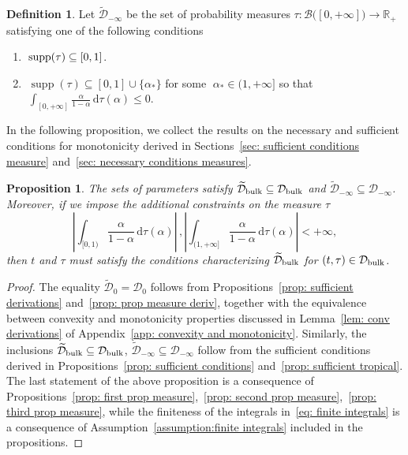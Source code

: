 \documentclass[aps,pra,11pt,onecolumn,nofootinbib,tightenlines]{revtex4-2}
\newtheorem{proposition}[theorem]{Proposition}
\theoremstyle{definition}
\newtheorem{definition}[theorem]{Definition}
\newcommand{\D}{\mathcal{D}}
\newcommand{\mc}[1]{\mathcal{#1}}
\newcommand{\mb}[1]{\mathbb{#1}}
\begin{document}
\begin{definition}
\label{def: D_infty}
 Let \(\widetilde{\D}_{-\infty}\) be the set of probability measures $\tau:\mc B\big([0,+\infty]\big)\to\mb R_+$ satisfying one of the following conditions
    \begin{enumerate}[itemsep=0pt,topsep=5pt]
    \item  $\;\textup{supp}(\tau) \subseteq [0,1]$.
    \item $\;\operatorname{supp}(\tau) \subseteq [0,1] \cup \{\alpha_*\}$ for some $\;\alpha_* \in (1, +\infty]$ so that $\;\displaystyle\int_{[0,+\infty]} \frac{\alpha}{1 - \alpha} \, \mathrm{d}\tau(\alpha) \leq 0$.
\end{enumerate}
\end{definition}

In the following proposition, we collect the results on the necessary and sufficient conditions for monotonicity derived in Sections~\ref{sec: sufficient conditions measure} and~\ref{sec: necessary conditions measures}.
\begin{proposition}
\label{prop: necessary conditions}
The sets of parameters satisfy $\widetilde{\mathcal{D}}_{\rm bulk} \subseteq \mathcal{D}_{\rm bulk}$ and 
$\widetilde{\mathcal{D}}_{-\infty} \subseteq \mathcal{D}_{-\infty}$. 
Moreover, if we impose the additional constraints on the measure $\tau$
\begin{equation}
\label{eq: finite integrals}
\left|\int_{[0,1)} \frac{\alpha}{1-\alpha}\, \mathrm{d}\tau(\alpha)\right|\,,
\left|\int_{(1,+\infty]} \frac{\alpha}{1-\alpha}\, \mathrm{d}\tau(\alpha)\right| < +\infty,
\end{equation}
then $t$ and $\tau$ must satisfy the conditions characterizing $\widetilde{\mathcal{D}}_{\rm bulk}$ for $(t,\tau)\in\mathcal{D}_{\rm bulk}$.
\end{proposition}
\begin{proof}
    The equality \(\widetilde{\mathcal{D}}_{0} = \mathcal{D}_{0}\) follows from Propositions~\ref{prop: sufficient derivations} and~\ref{prop: prop measure deriv}, together with the equivalence between convexity and monotonicity properties discussed in Lemma~\ref{lem: conv derivations} of Appendix~\ref{app: convexity and monotonicity}.
 Similarly, the inclusions $\widetilde{\mathcal{D}}_{\rm bulk} \subseteq \mathcal{D}_{\rm bulk}$, 
$\widetilde{\mathcal{D}}_{-\infty} \subseteq \mathcal{D}_{-\infty}$ follow from the sufficient conditions derived in Propositions~\ref{prop: sufficient conditions} and~\ref{prop: sufficient tropical}. The last statement of the above proposition %
is a consequence of Propositions~\ref{prop: first prop measure},~\ref{prop: second prop measure},~\ref{prop: third prop measure}, while the finiteness of the integrals in~\eqref{eq: finite integrals} is a consequence of Assumption~\ref{assumption:finite integrals} included in the propositions.
\end{proof}
\end{document}
